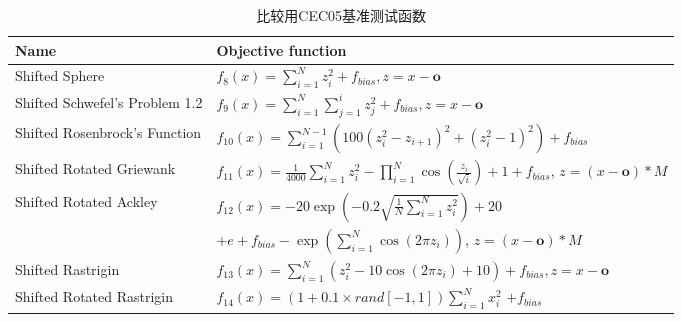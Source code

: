 \begin{table*}[!htb]
\renewcommand\arraystretch{.2}
\begin{center}
\caption{比较用CEC05基准测试函数}
\label{Tab:CEC05}
\vspace{0.5em}\centering
\begin{tabularx}{1.\textwidth}{p{4.5cm} p{12.5cm}}
\hline
Name &  Objective function \\
\hline
Shifted Sphere &  $f_8(x)=\sum_{i=1}^N z_i^2+f_{bias}, z=x-\bm o$\\
Shifted Schwefel's Problem 1.2 &  $f_{9}(x)=\sum_{i=1}^N \sum _{j=1}^i z_j^2+f_{bias}, z=x-\bm o$\\
Shifted Rosenbrock's Function &  $f_{10}(x)=\sum_{i=1}^{N-1} (100(z_i^2-z_{i+1})^2+(z_i^2-1)^2 )+f_{bias}$\\
Shifted Rotated Griewank&   $f_{11}(x)=\frac{1}{4000}\sum_{i=1}^{N}{z_i^2}-\prod_{i=1}^{N}\cos(\frac{z_i}{\sqrt{i}})+1+f_{bias}$, $z=(x-\bm o)\ast M$\\
Shifted Rotated Ackley &   $f_{12}(x)=-20\exp(-0.2 \sqrt{\frac{1}{N}\sum_{i=1}^{N}{z_i^2}})+20$\\
                         &\qquad +$e+f_{bias} -\exp(\sum_{i=1}^N\cos(2\pi z_i))$, $z=(x-\bm o)\ast M$\\
Shifted Rastrigin &  $f_{13}(x)=\sum_{i=1}^{N}(z_i^2-10\cos(2\pi z_i)+10)+f_{bias}, z=x-\bm o$\\
Shifted Rotated  Rastrigin&  $f_{14}(x)=(1+0.1\times rand[-1,1])\sum_{i=1}^N x_i^2$ $+f_{bias}$\\
\hline
\end{tabularx}
\end{center}
\end{table*}
